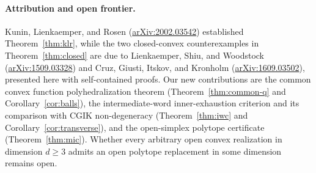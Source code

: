 \documentclass[11pt]{article}
\theoremstyle{plain}
\theoremstyle{definition}
\theoremstyle{remark}
\begin{document}
\paragraph{Attribution and open frontier.}
Kunin, Lienkaemper, and Rosen (\href{https://arxiv.org/abs/2002.03542}{arXiv:2002.03542}) established Theorem~\ref{thm:klr}, while the two closed-convex counterexamples in Theorem~\ref{thm:closed} are due to Lienkaemper, Shiu, and Woodstock (\href{https://arxiv.org/abs/1509.03328}{arXiv:1509.03328}) and Cruz, Giusti, Itskov, and Kronholm (\href{https://arxiv.org/abs/1609.03502}{arXiv:1609.03502}), presented here with self-contained proofs. Our new contributions are the common convex function polyhedralization theorem (Theorem~\ref{thm:common-q} and Corollary~\ref{cor:balls}), the intermediate-word inner-exhaustion criterion and its comparison with CGIK non-degeneracy (Theorem~\ref{thm:iwc} and Corollary~\ref{cor:transverse}), and the open-simplex polytope certificate (Theorem~\ref{thm:mic}). Whether every arbitrary open convex realization in dimension $d \ge 3$ admits an open polytope replacement in some dimension remains open.
\end{document}
